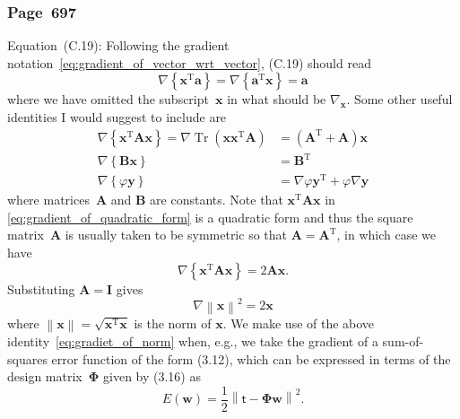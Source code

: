 \documentclass[12pt,a4paper]{article}
\newcommand{\erratum}[1]{\subsubsection*{#1}}
\begin{document}
\erratum{Page~697}
Equation~(C.19):
Following the gradient notation~\eqref{eq:gradient_of_vector_wrt_vector}, (C.19) should read
\begin{equation}
\nabla \left\{ \mathbf{x}^{\operatorname{T}} \mathbf{a} \right\} = 
\nabla \left\{ \mathbf{a}^{\operatorname{T}} \mathbf{x} \right\} = 
\mathbf{a}
\end{equation}
where we have omitted the subscript~$\mathbf{x}$ in what should be $\nabla_{\mathbf{x}}$.
Some other useful identities I would suggest to include are
\begin{align}
\nabla \left\{ \mathbf{x}^{\operatorname{T}} \mathbf{A} \mathbf{x} \right\} =
\nabla \operatorname{Tr}\left(\mathbf{x}\mathbf{x}^{\operatorname{T}}\mathbf{A}\right) &=
\left( \mathbf{A}^{\operatorname{T}} + \mathbf{A} \right)\mathbf{x}
\label{eq:gradient_of_quadratic_form} \\
\nabla \left\{ \mathbf{B}\mathbf{x} \right\} & = \mathbf{B}^{\operatorname{T}}
\label{eq:gradient_of_matrix_vector_product} \\
\nabla \left\{ \varphi\mathbf{y} \right\} &=
\nabla\varphi \mathbf{y}^{\operatorname{T}} + \varphi \nabla\mathbf{y}
\label{eq:gradient_of_scalar_vector_product}
\end{align}
where matrices~$\mathbf{A}$ and $\mathbf{B}$ are constants.
Note that $\mathbf{x}^{\operatorname{T}} \mathbf{A} \mathbf{x}$ in
\eqref{eq:gradient_of_quadratic_form} is a quadratic form and thus
the square matrix~$\mathbf{A}$ is usually taken to be symmetric so that
$\mathbf{A} = \mathbf{A}^{\operatorname{T}}$, in which case we have
\begin{equation}
\nabla \left\{ \mathbf{x}^{\operatorname{T}} \mathbf{A} \mathbf{x} \right\} =
2\mathbf{A} \mathbf{x} \label{eq:gradient_of_quadratic_form_symmetric} .
\end{equation}
Substituting $\mathbf{A} = \mathbf{I}$ gives
\begin{equation}
\nabla \left\| \mathbf{x} \right\|^{2} = 2\mathbf{x} \label{eq:gradiet_of_norm}
\end{equation}
where $\left\| \mathbf{x} \right\| = \sqrt{\mathbf{x}^{\operatorname{T}}\mathbf{x}}$ is
the norm of $\mathbf{x}$.
We make use of the above identity~\eqref{eq:gradiet_of_norm} when, e.g., we take the gradient of
a sum-of-squares error function of the form (3.12),
which can be expressed in terms of the design matrix~$\bm{\Phi}$ given by (3.16) as
\begin{equation}
E(\mathbf{w}) = \frac{1}{2} \left\| \bm{\mathsf{t}} - \bm{\Phi}\mathbf{w} \right\|^2
\label{eq:sum_of_squares_error} .
\end{equation}
\end{document}
